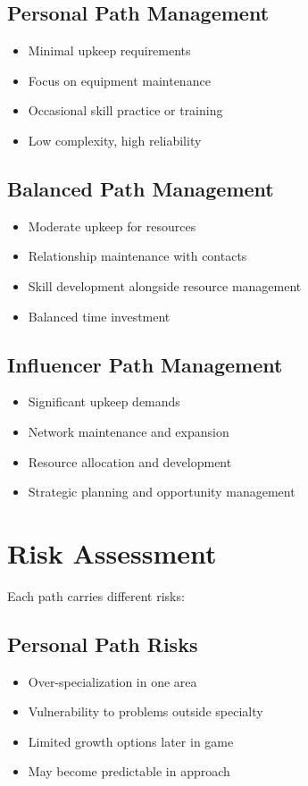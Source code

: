 \begin{multicols}{2}
\subsection*{Personal Path Management}
\begin{itemize}
\item Minimal upkeep requirements
\item Focus on equipment maintenance
\item Occasional skill practice or training
\item Low complexity, high reliability
\end{itemize}

\subsection*{Balanced Path Management}
\begin{itemize}
\item Moderate upkeep for resources
\item Relationship maintenance with contacts
\item Skill development alongside resource management
\item Balanced time investment
\end{itemize}

\subsection*{Influencer Path Management}
\begin{itemize}
\item Significant upkeep demands
\item Network maintenance and expansion
\item Resource allocation and development
\item Strategic planning and opportunity management
\end{itemize}

\section{Risk Assessment}

Each path carries different risks:

\subsection*{Personal Path Risks}
\begin{itemize}
\item Over-specialization in one area
\item Vulnerability to problems outside specialty
\item Limited growth options later in game
\item May become predictable in approach
\end{itemize}


\end{multicols}
